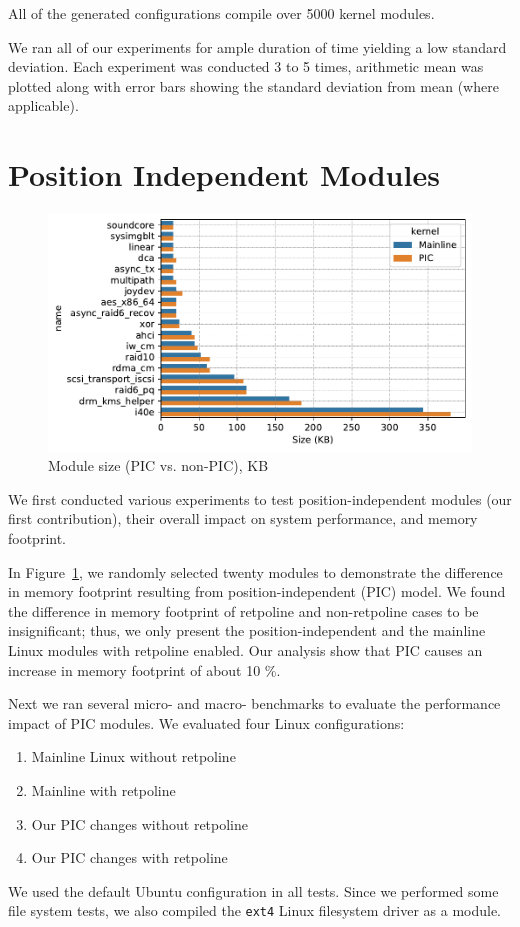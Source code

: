 All of the generated configurations compile over 5000 kernel modules.

We ran all of our experiments for ample duration of time yielding a low standard deviation. Each experiment was conducted 3 to 5 times, arithmetic mean was plotted along with error bars showing the standard deviation from mean (where applicable).

\section{Position Independent Modules}
\label{sec:eval:pic}
\begin{figure}[ht!]
\centering
\includegraphics[width=0.7\columnwidth]{charts/module_sizes.pdf}
\caption{Module size (PIC vs. non-PIC), KB}
\label{fig:modulesiszes}
\end{figure}

We first conducted various experiments to test position-independent modules (our first contribution), their overall impact on system performance, and memory footprint.

In Figure~\ref{fig:modulesiszes}, we randomly selected twenty modules to demonstrate the difference in memory footprint resulting from position-independent (PIC) model.
We found the difference in memory footprint of retpoline and non-retpoline cases to be insignificant; thus, we only present the position-independent and the mainline Linux modules with retpoline enabled. Our analysis show that PIC causes an increase in memory footprint of about 10 \%.

Next we ran several micro- and macro- benchmarks to evaluate the performance impact of PIC modules. We evaluated four Linux configurations:
\begin{enumerate}[noitemsep]
    \item Mainline Linux without retpoline
    \item Mainline with retpoline
    \item Our PIC changes without retpoline
    \item Our PIC changes with retpoline
\end{enumerate}
We used the default Ubuntu configuration in all tests. Since we performed some file system tests, we also
compiled the \verb|ext4| Linux filesystem driver as a module.

